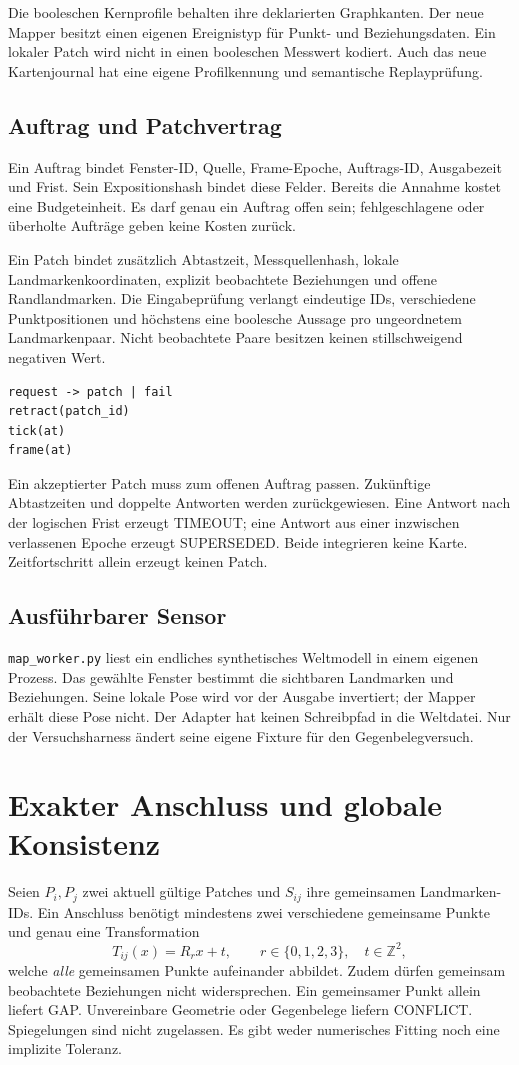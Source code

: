 \documentclass[11pt,a4paper]{article}
\newcommand{\nextsection}[2]{\clearpage{\color{accent}\small\textsf{#1}}\section{#2}}
\begin{document}
Die booleschen Kernprofile behalten ihre deklarierten Graphkanten.
Der neue Mapper besitzt einen eigenen Ereignistyp für Punkt- und
Beziehungsdaten. Ein lokaler Patch wird nicht in einen booleschen
Messwert kodiert. Auch das neue Kartenjournal hat eine eigene
Profilkennung und semantische Replayprüfung.

\subsection{Auftrag und Patchvertrag}
Ein Auftrag bindet Fenster-ID, Quelle, Frame-Epoche, Auftrags-ID,
Ausgabezeit und Frist. Sein Expositionshash bindet diese Felder.
Bereits die Annahme kostet eine Budgeteinheit. Es darf genau ein
Auftrag offen sein; fehlgeschlagene oder überholte Aufträge geben
keine Kosten zurück.

Ein Patch bindet zusätzlich Abtastzeit, Messquellenhash, lokale
Landmarkenkoordinaten, explizit beobachtete Beziehungen und offene
Randlandmarken. Die Eingabeprüfung verlangt eindeutige IDs,
verschiedene Punktpositionen und höchstens eine boolesche Aussage
pro ungeordnetem Landmarkenpaar. Nicht beobachtete Paare besitzen
keinen stillschweigend negativen Wert.

\begin{lstlisting}
request -> patch | fail
retract(patch_id)
tick(at)
frame(at)
\end{lstlisting}
Ein akzeptierter Patch muss zum offenen Auftrag passen. Zukünftige
Abtastzeiten und doppelte Antworten werden zurückgewiesen. Eine
Antwort nach der logischen Frist erzeugt TIMEOUT; eine Antwort aus
einer inzwischen verlassenen Epoche erzeugt SUPERSEDED. Beide
integrieren keine Karte. Zeitfortschritt allein erzeugt keinen Patch.

\subsection{Ausführbarer Sensor}
\texttt{map\_worker.py} liest ein endliches synthetisches Weltmodell
in einem eigenen Prozess. Das gewählte Fenster bestimmt die sichtbaren
Landmarken und Beziehungen. Seine lokale Pose wird vor der Ausgabe
invertiert; der Mapper erhält diese Pose nicht. Der Adapter hat
keinen Schreibpfad in die Weltdatei. Nur der Versuchsharness ändert
seine eigene Fixture für den Gegenbelegversuch.

\nextsection{30 / OVERLAP-WITNESS}{Exakter Anschluss und globale Konsistenz}
Seien $P_i,P_j$ zwei aktuell gültige Patches und
$S_{ij}$ ihre gemeinsamen Landmarken-IDs. Ein Anschluss benötigt
mindestens zwei verschiedene gemeinsame Punkte und genau eine
Transformation
\[
T_{ij}(x)=R_r x+t,\qquad r\in\{0,1,2,3\},\quad t\in\mathbb Z^2,
\]
welche \emph{alle} gemeinsamen Punkte aufeinander abbildet.
Zudem dürfen gemeinsam beobachtete Beziehungen nicht widersprechen.
Ein gemeinsamer Punkt allein liefert GAP. Unvereinbare Geometrie
oder Gegenbelege liefern CONFLICT. Spiegelungen sind nicht zugelassen.
Es gibt weder numerisches Fitting noch eine implizite Toleranz.
\end{document}
